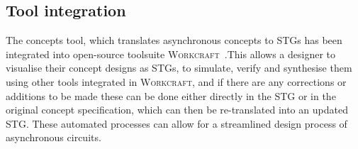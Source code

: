 \documentclass[british, journal]{IEEEtran}
\newcommand{\noun}[1]{\textsc{#1}}
\begin{document}
%
%
%
%
%

\subsection{Tool integration}

The concepts tool, which translates asynchronous concepts to STGs has been
integrated into open-source toolsuite \noun{Workcraft}~\cite{Workcraft_website}.This allows a designer to visualise their concept designs as STGs, to simulate,
verify and synthesise them using other tools integrated in \noun{Workcraft},
and if there are any corrections or additions to be made these can be done
either
directly in the STG or in the original concept specification, which can then
be re-translated into an updated STG. These automated processes can allow for a
streamlined design process of asynchronous circuits.
\end{document}
